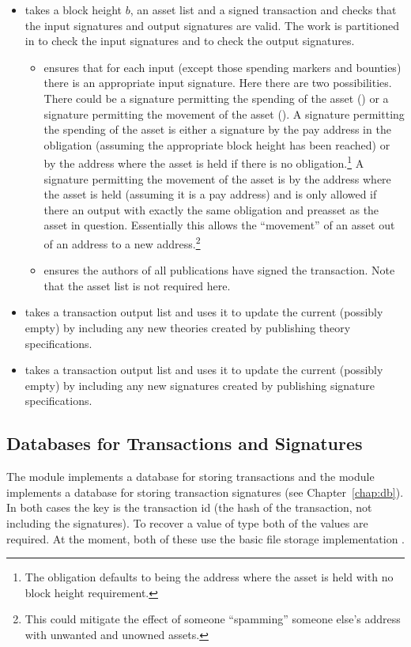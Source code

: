 \begin{itemize}
\item {} takes a block height $b$, an asset list
and a signed transaction and checks that the input signatures and output signatures
are valid.
The work is partitioned in {}
to check the input signatures
and {}
to check the output signatures.
\begin{itemize}
\item {} ensures that for each input
(except those spending markers and bounties)
there is an appropriate input signature. Here there are two possibilities.
There could be a signature permitting the spending of the asset ({})
or a signature permitting the movement of the asset ({}).
A signature permitting the spending of the asset is either a signature
by the pay address in the obligation (assuming the appropriate block height has been reached)
or by the address where the asset is held if there is no obligation.\footnote{The obligation {} defaults
to being the address where the asset is held with no block height requirement.}
A signature permitting the movement of the asset is by the address where the asset is held (assuming it is
a pay address) and is only allowed if there an output with exactly the same obligation and preasset
as the asset in question.
Essentially this allows the ``movement'' of an asset out of an address to a new address.\footnote{This could mitigate the effect of someone ``spamming'' someone else's address with unwanted and unowned assets.}
\item {} ensures the authors of all publications
have signed the transaction. Note that the asset list is not required here.
\end{itemize}
\item {} takes a transaction output list
and uses it to update the current (possibly empty) {} by including any new
theories created by publishing theory specifications.
\item {} takes a transaction output list
and uses it to update the current (possibly empty) {} by including any new
signatures created by publishing signature specifications.
\end{itemize}

\subsection{Databases for Transactions and Signatures}

The module {} implements a database for storing transactions
and the module {} implements a database for storing
transaction signatures
(see Chapter~\ref{chap:db}).
In both cases the key is the transaction id (the hash of the transaction,
not including the signatures).
To recover a value of type {} both of the values are required.
At the moment, both of these use the basic file storage implementation {}.

